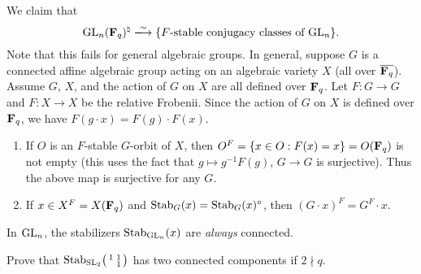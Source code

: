 \documentclass{article}
\begin{document}
We claim that 
\[
  \generallinear_n(\dF_q)^\natural\isomorphism \{\text{$F$-stable conjugacy classes of $\generallinear_n$}\} . 
\]
Note that this fails for general algebraic groups. In general, suppose $G$ 
is a connected affine algebraic group acting on an algebraic variety $X$ (all 
over $\overline{\mathbf{F}_q}$). Assume $G$, $X$, and the action of $G$ on $X$ are all 
defined over $\mathbf{F}_q$. Let $F:G\to G$ and $F:X\to X$ be the relative Frobenii. 
Since the action of $G$ on $X$ is defined over $\mathbf{F}_q$, we have 
$F(g\cdot x) = F(g) \cdot F(x)$. 
\begin{enumerate}
  \item If $O$ is an $F$-stable $G$-orbit of $X$, then 
    $O^F=\{x\in O:F(x)=x\}=O(\mathbf{F}_q)$ is not empty (this uses the fact that 
    $g\mapsto g^{-1} F(g)$, $G\to G$ is surjective). Thus the above map is 
    surjective for any $G$. 
  \item If $x\in X^F=X(\mathbf{F}_q)$ and $\operatorname{Stab}_G(x) = \operatorname{Stab}_G(x)^\circ$, 
    then $(G\cdot x)^F = G^F\cdot x$. 
\end{enumerate}

In $\operatorname{GL}_n$, the stabilizers $\operatorname{Stab}_{\operatorname{GL}_n}(x)$ are 
\emph{always} connected. 

\begin{exercise}
Prove that $\operatorname{Stab}_{\operatorname{SL}_2}\bigl(\begin{smallmatrix} 1 & 1 \\  & 1 \end{smallmatrix} \bigr)$ has two connected 
components if $2\nmid q$. 
\end{exercise}







\end{document}
